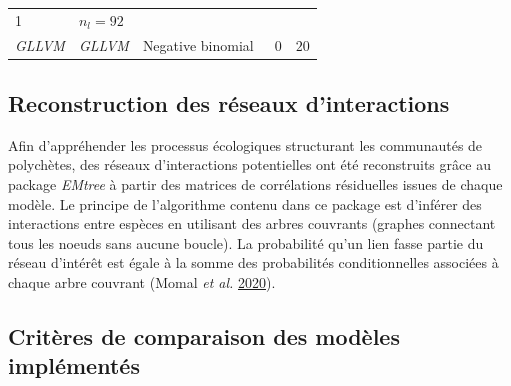 \documentclass[12pt,]{article}
\begin{document}
{\begin{longtable}[]{@{}lllll@{}}
\begin{minipage}[t]{0.24\columnwidth}
1\strut
\end{minipage} & \begin{minipage}[t]{0.22\columnwidth}\raggedright
\(n_l = 92\)\strut
\end{minipage}\tabularnewline
\begin{minipage}[t]{0.11\columnwidth}\raggedright
\emph{GLLVM}\strut
\end{minipage} & \begin{minipage}[t]{0.09\columnwidth}\raggedright
\emph{GLLVM}\strut
\end{minipage} & \begin{minipage}[t]{0.19\columnwidth}\raggedright
Negative binomial\strut
\end{minipage} & \begin{minipage}[t]{0.24\columnwidth}\raggedright
~0\strut
\end{minipage} & \begin{minipage}[t]{0.22\columnwidth}\raggedright
\(20\)\strut
\end{minipage}\tabularnewline
\bottomrule
\end{longtable}}\FloatBarrier


\hypertarget{reconstruction-des-ruxe9seaux-dinteractions}{%
\subsection{Reconstruction des réseaux
d'interactions}\label{reconstruction-des-ruxe9seaux-dinteractions}}

Afin d'appréhender les processus écologiques structurant les communautés
de polychètes, des réseaux d'interactions potentielles ont été
reconstruits grâce au package \emph{EMtree} à partir des matrices de
corrélations résiduelles issues de chaque modèle. Le principe de
l'algorithme contenu dans ce package est d'inférer des interactions
entre espèces en utilisant des arbres couvrants (graphes connectant tous
les noeuds sans aucune boucle). La probabilité qu'un lien fasse partie
du réseau d'intérêt est égale à la somme des probabilités
conditionnelles associées à chaque arbre couvrant (Momal \emph{et al.}
\protect\hyperlink{ref-Momal_2020}{2020}).

\hypertarget{crituxe8res-de-comparaison-des-moduxe8les-impluxe9mentuxe9s}{%
\subsection{Critères de comparaison des modèles
implémentés}\label{crituxe8res-de-comparaison-des-moduxe8les-impluxe9mentuxe9s}}
\end{document}
